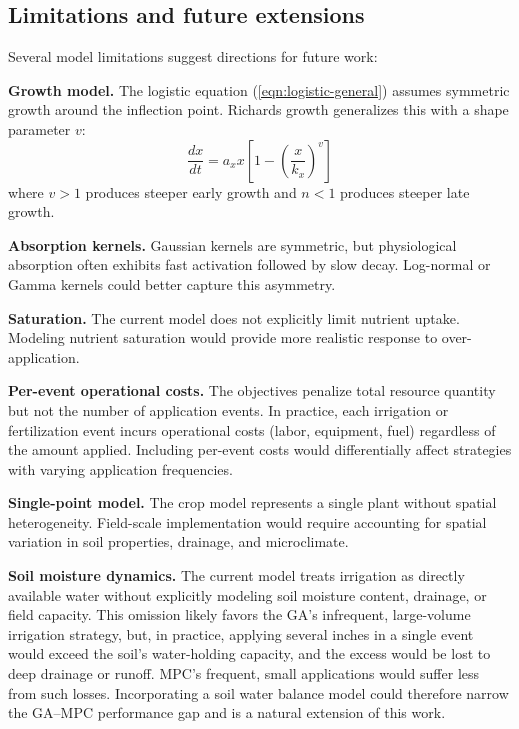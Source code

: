 \documentclass[pdflatex,sn-mathphys-num]{sn-jnl}
\newcommand{\df}[2]{\displaystyle\frac{#1}{#2}}
\begin{document}
\subsection{Limitations and future extensions}\label{subsec:future-work}

Several model limitations suggest directions for future work:

\textbf{Growth model.} The logistic equation (\ref{eqn:logistic-general}) assumes symmetric growth around the inflection point. Richards growth generalizes this with a shape parameter $v$:
\begin{equation}
\df{dx}{dt} = a_{x}x\left[ 1 - \left( \df{x}{k_{x}} \right)^{v} \right]
\label{eqn:richards-growth}
\end{equation}
where $v > 1$ produces steeper early growth and $n < 1$ produces steeper late growth.

\textbf{Absorption kernels.} Gaussian kernels are symmetric, but physiological absorption often exhibits fast activation followed by slow decay. Log-normal or Gamma kernels could better capture this asymmetry.

\textbf{Saturation.} The current model does not explicitly limit nutrient uptake. Modeling nutrient saturation would provide more realistic response to over-application.

\textbf{Per-event operational costs.} The objectives penalize total resource quantity but not the number of application events. In practice, each irrigation or fertilization event incurs operational costs (labor, equipment, fuel) regardless of the amount applied. Including per-event costs would differentially affect strategies with varying application frequencies.

\textbf{Single-point model.} The crop model represents a single plant without spatial heterogeneity. Field-scale implementation would require accounting for spatial variation in soil properties, drainage, and microclimate.

\textbf{Soil moisture dynamics.} The current model treats irrigation as directly available water without explicitly modeling soil moisture content, drainage, or field capacity. This omission likely favors the GA's infrequent, large-volume irrigation strategy, but, in practice, applying several inches in a single event would exceed the soil's water-holding capacity, and the excess would be lost to deep drainage or runoff. MPC's frequent, small applications would suffer less from such losses. Incorporating a soil water balance model could therefore narrow the GA--MPC performance gap and is a natural extension of this work.
\end{document}
